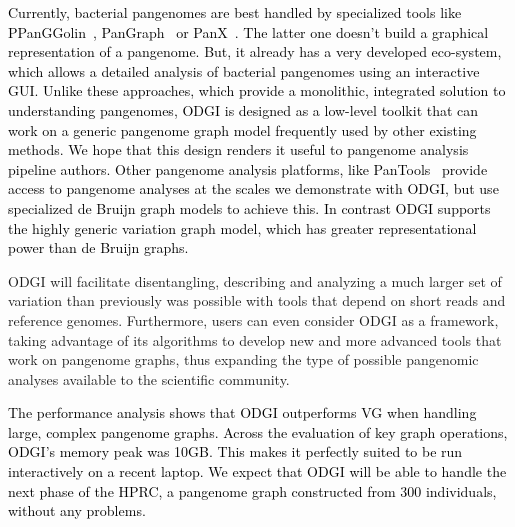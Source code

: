 \documentclass{bioinfo}
\newcommand{\REVIEWED}[1]{{\textcolor{Black}{#1}}}
\begin{document}
\REVIEWED{Currently, bacterial pangenomes are best handled by specialized tools like PPanGGolin~\citep{Gautreau2020}, PanGraph~\citep{Noll2022} or PanX~\citep{Wei2017}. The latter one doesn't build a graphical representation of  a pangenome. But, it already has a very developed eco-system, which allows a detailed analysis of bacterial pangenomes using an interactive GUI.
Unlike these approaches, which provide a monolithic, integrated solution to understanding pangenomes, ODGI is designed as a low-level toolkit that can work on a generic pangenome graph model frequently used by other existing methods.
We hope that this design renders it useful to pangenome analysis pipeline authors.
Other pangenome analysis platforms, like PanTools~\citep{Sheikhizadeh_2016} provide access to pangenome analyses at the scales we demonstrate with ODGI, but use specialized de Bruijn graph models to achieve this. In contrast ODGI supports the highly generic variation graph model, which has greater representational power than de Bruijn graphs.}

ODGI will facilitate disentangling,
describing and analyzing a much larger set of variation than previously was possible with tools that depend on short reads and reference genomes.
Furthermore, users can even consider ODGI as a framework, taking advantage of its algorithms to develop new and more advanced tools that work on pangenome graphs,
thus expanding the type of possible pangenomic analyses available to the scientific community.

\REVIEWED{The performance analysis shows that ODGI outperforms VG when handling large, complex pangenome graphs.
Across the evaluation of key graph operations, ODGI's memory peak was 10GB. This makes it perfectly suited to be run interactively on a recent laptop.
We expect that ODGI will be able to handle the next phase of the HPRC, a pangenome graph constructed from 300 individuals, without any problems.}
\end{document}
